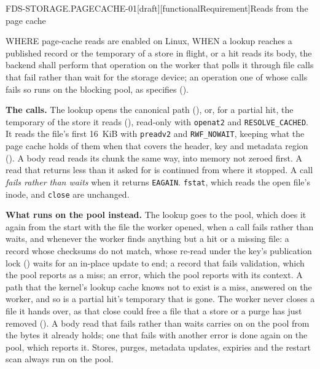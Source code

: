 \begin{requirement}{FDS-STORAGE.PAGECACHE-01}[draft][functionalRequirement]{Reads from the page cache}


  WHERE page-cache reads are enabled on Linux, WHEN a lookup reaches a
  published record or the temporary of a store in flight, or a hit reads its
  body, the backend shall perform that operation on the worker that polls it
  through file calls that fail rather than wait for the storage device; an
  operation one of whose calls fails so runs on the blocking pool, as
   specifies
  ().

  \textbf{The calls.} The lookup opens the canonical path
  (), or, for a partial hit, the temporary of
  the store it reads (), read-only with
  \texttt{openat2} and \texttt{RESOLVE\_CACHED}. It reads the file's first
  16~KiB with \texttt{preadv2} and \texttt{RWF\_NOWAIT}, keeping what the
  page cache holds of them when that covers the header, key and metadata
  region (). A body read reads its chunk the
  same way, into memory not zeroed first. A read that returns less than it
  asked for is continued from where it stopped. A call \emph{fails rather
  than waits} when it returns \texttt{EAGAIN}. \texttt{fstat}, which reads
  the open file's inode, and \texttt{close} are unchanged.

  \textbf{What runs on the pool instead.} The lookup goes to the pool, which
  does it again from the start with the file the worker opened, when a call
  fails rather than waits, and whenever the worker finds anything but a hit
  or a missing file: a record whose checksums do not match, whose re-read
  under the key's publication lock () waits
  for an in-place update to end; a record that fails validation, which the
  pool reports as a miss; an error, which the pool reports with its context.
  A path that the kernel's lookup cache knows not to exist is a miss,
  answered on the worker, and so is a partial hit's temporary that is gone.
  The worker never closes a file it hands over, as that close could free a
  file that a store or a purge has just removed
  (). A body read that fails rather than
  waits carries on on the pool from the bytes it already holds; one that
  fails with another error is done again on the pool, which reports it.
  Stores, purges, metadata updates, expiries and the restart scan always run
  on the pool.


\end{requirement}
